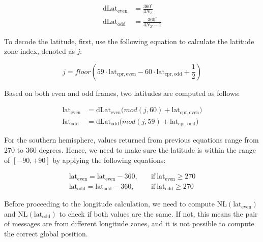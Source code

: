 \begin{equation}
\begin{split}
  \mathrm{dLat}_\mathrm{even} &= \frac{360^\circ}{4 N_Z} \\
  \mathrm{dLat}_\mathrm{odd} &= \frac{360^\circ}{4 N_Z - 1}
\end{split}
\end{equation}


To decode the latitude, first, use the following equation to calculate the latitude zone index, denoted as $j$:

\begin{equation}
  j = floor \left( 59 \cdot \mathrm{lat}_\mathrm{cpr, even} - 60 \cdot \mathrm{lat}_\mathrm{cpr,odd} + \frac{1}{2}  \right)
\end{equation}


Based on both even and odd frames, two latitudes are computed as follows:

\begin{equation}
  \begin{split}
    \mathrm{lat}_\mathrm{even} &= \mathrm{dLat}_\mathrm{even} \Big( mod(j, 60) + \mathrm{lat}_\mathrm{cpr, even} \Big) \\
    \mathrm{lat}_\mathrm{odd} &= \mathrm{dLat}_\mathrm{odd} \Big( mod(j, 59) + \mathrm{lat}_\mathrm{cpr,odd} \Big)
  \end{split}
\end{equation}


For the southern hemisphere, values returned from previous equations range from 270 to 360 degrees. Hence, we need to make sure the latitude is within the range of $[-90, +90]$ by applying the following equations:

\begin{equation}
  \begin{split}
    \mathrm{lat}_\mathrm{even} = \mathrm{lat}_\mathrm{even} - 360,  \quad &\text{if}~\mathrm{lat}_\mathrm{even} \ge 270 \\
    \mathrm{lat}_\mathrm{odd} = \mathrm{lat}_\mathrm{odd} - 360,  \quad &\text{if}~\mathrm{lat}_\mathrm{odd} \ge 270
  \end{split}
\end{equation}


Before proceeding to the longitude calculation, we need to compute $\mathrm{NL}(\mathrm{lat}_\mathrm{even})$ and $\mathrm{NL}(\mathrm{lat}_\mathrm{odd})$ to check if both values are the same. If not, this means the pair of messages are from different longitude zones, and it is not possible to compute the correct global position.

